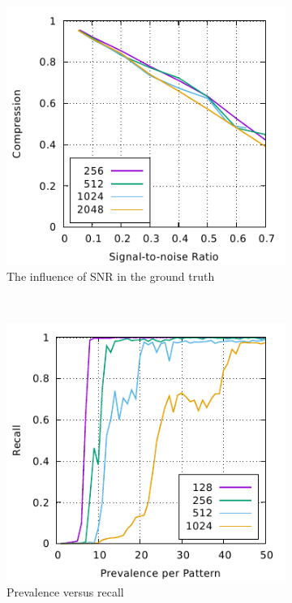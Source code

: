 \documentclass{llncs}
\begin{document}


\begin{figure}[p]%
	\begin{subfigure}[t]{0.5\textwidth}
	\includegraphics[scale=1]{figures/experiments-gnuplottex-fig1.pdf}
	\caption{The influence of SNR in the ground truth}
	\label{fig:snr}

	\end{subfigure}%
	~
	\begin{subfigure}[t]{0.5\textwidth}
	\includegraphics[scale=1]{figures/experiments-gnuplottex-fig2.pdf}
	\caption{Prevalence versus recall}
	\label{fig:usage}
	\end{subfigure}
	\caption{}
	\label{fig:plots}
\end{figure}
\end{document}
